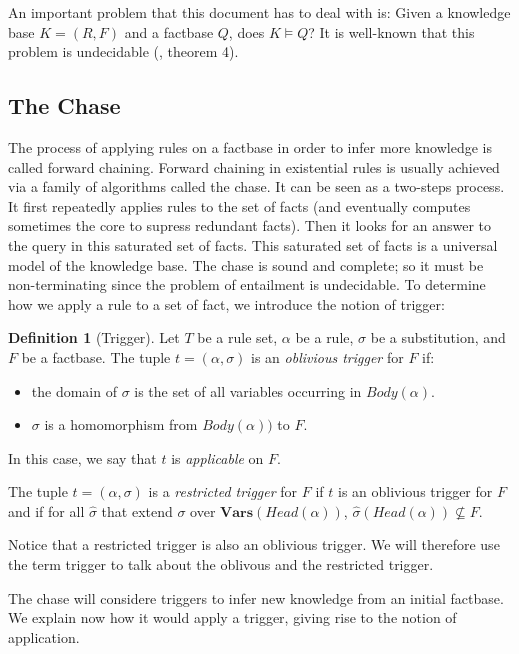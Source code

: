 \documentclass{article}
\theoremstyle{definition}
\newtheorem{definition}{Definition}[section]
\theoremstyle{remark}
\newcommand{\Vars}{\textbf{Vars}}
\begin{document}
An important problem that this document has to deal with is: Given a knowledge base $K=(R,F)$ and a factbase $Q$,  does $K \models Q$? It  is  well-known  that  this  problem  is  undecidable (\cite{NP2}, theorem 4). 



\subsection{The Chase}

The process of applying rules on a factbase in order to infer more knowledge is called forward chaining.   Forward  chaining  in  existential  rules  is  usually achieved  via  a  family  of  algorithms  called the  chase. It can be seen as a two-steps process. It first repeatedly applies rules to the set of facts (and eventually computes sometimes the core to supress redundant facts). Then it looks for an answer to the query in this saturated set of facts. This saturated set of facts is a universal model of the knowledge base. The chase is sound and complete; so it must be non-terminating since the problem of entailment is undecidable. To determine how we apply a rule to a set of fact, we introduce the notion of trigger:

\begin{definition}[Trigger]
Let $T$ be a rule set, $\alpha$ be a rule, $\sigma$ be a substitution, and $F$ be a factbase. The tuple $t = (\alpha,\sigma)$ is an \emph{oblivious trigger} for $F$ if: 
\begin{itemize}
\item the domain of $\sigma$ is the set of all variables occurring in $Body(\alpha)$.
\item $\sigma$ is a homomorphism from $Body(\alpha))$ to $F$.
\end{itemize}
In this case, we say that $t$ is \emph{applicable} on $F$.

The tuple $t = (\alpha,\sigma)$ is a \emph{restricted trigger} for $F$ if $t$ is an oblivious trigger for $F$ and if for all $\hat \sigma$ that extend $\sigma$ over $\Vars(\textit{Head}(\alpha))$, $\hat \sigma(Head(\alpha)) \nsubseteq F$.
\end{definition} 



Notice that a restricted trigger is also an oblivious trigger. We will therefore use the term trigger to talk about the oblivous and the restricted trigger.

The chase will considere triggers to infer new knowledge from an initial factbase. We explain now how it would apply a trigger, giving rise to the notion of application. 
\end{document}
